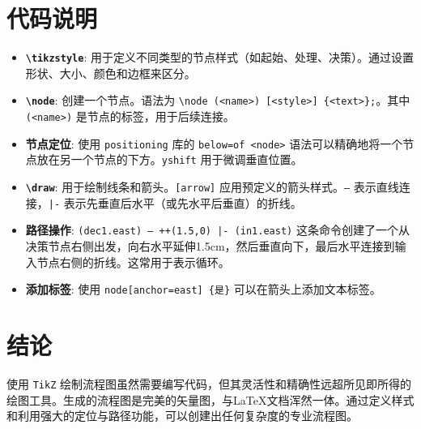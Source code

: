 \documentclass{article}
\begin{document}
\section{代码说明}
\begin{itemize}
    \item \textbf{\texttt{\textbackslash tikzstyle}}: 用于定义不同类型的节点样式（如起始、处理、决策）。通过设置形状、大小、颜色和边框来区分。
    \item \textbf{\texttt{\textbackslash node}}: 创建一个节点。语法为 \texttt{\textbackslash node (<name>) [<style>] \{<text>\};}。其中 \texttt{(<name>)} 是节点的标签，用于后续连接。
    \item \textbf{节点定位}: 使用 \texttt{positioning} 库的 \texttt{below=of <node>} 语法可以精确地将一个节点放在另一个节点的下方。\texttt{yshift} 用于微调垂直位置。
    \item \textbf{\texttt{\textbackslash draw}}: 用于绘制线条和箭头。\texttt{[arrow]} 应用预定义的箭头样式。\texttt{--} 表示直线连接，\texttt{|-} 表示先垂直后水平（或先水平后垂直）的折线。
    \item \textbf{路径操作}: \texttt{(dec1.east) -- ++(1.5,0) |- (in1.east)} 这条命令创建了一个从决策节点右侧出发，向右水平延伸1.5cm，然后垂直向下，最后水平连接到输入节点右侧的折线。这常用于表示循环。
    \item \textbf{添加标签}: 使用 \texttt{node[anchor=east] \{是\}} 可以在箭头上添加文本标签。
\end{itemize}

\section{结论}
使用 \texttt{TikZ} 绘制流程图虽然需要编写代码，但其灵活性和精确性远超所见即所得的绘图工具。生成的流程图是完美的矢量图，与LaTeX文档浑然一体。通过定义样式和利用强大的定位与路径功能，可以创建出任何复杂度的专业流程图。
\end{document}
